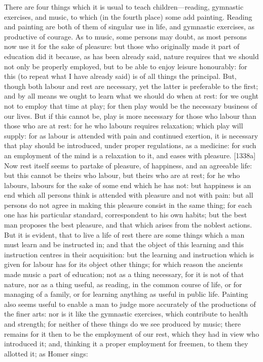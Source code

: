 There are four things which it is usual to teach children—reading,
gymnastic exercises, and music, to which (in the fourth place) some add
painting. Reading and painting are both of them of singular use in life,
and gymnastic exercises, as productive of courage. As to music, some
persons may doubt, as most persons now use it for the sake of pleasure:
but those who originally made it part of education did it because, as has
been already said, nature requires that we should not only be properly
employed, but to be able to enjoy leisure honourably: for this (to repeat
what I have already said) is of all things the principal. But, though both
labour and rest are necessary, yet the latter is preferable to the first;
and by all means we ought to learn what we should do when at rest: for we
ought not to employ that time at play; for then play would be the
necessary business of our lives. But if this cannot be, play is more
necessary for those who labour than those who are at rest: for he who
labours requires relaxation; which play will supply: for as labour is
attended with pain and continued exertion, it is necessary that play
should be introduced, under proper regulations, as a medicine: for such an
employment of the mind is a relaxation to it, and eases with pleasure.
[1338a] Now rest itself seems to partake of pleasure, of happiness, and an
agreeable life: but this cannot be theirs who labour, but theirs who are
at rest; for he who labours, labours for the sake of some end which he has
not: but happiness is an end which all persons think is attended with
pleasure and not with pain: but all persons do not agree in making this
pleasure consist in the same thing; for each one has his particular
standard, correspondent to his own habits; but the best man proposes the
best pleasure, and that which arises from the noblest actions. But it is
evident, that to live a life of rest there are some things which a man
must learn and be instructed in; and that the object of this learning and
this instruction centres in their acquisition: but the learning and
instruction which is given for labour has for its object other things; for
which reason the ancients made music a part of education; not as a thing
necessary, for it is not of that nature, nor as a thing useful, as
reading, in the common course of life, or for managing of a family, or for
learning anything as useful in public life. Painting also seems useful to
enable a man to judge more accurately of the productions of the finer
arts: nor is it like the gymnastic exercises, which contribute to health
and strength; for neither of these things do we see produced by music;
there remains for it then to be the employment of our rest, which they had
in view who introduced it; and, thinking it a proper employment for
freemen, to them they allotted it; as Homer sings:

